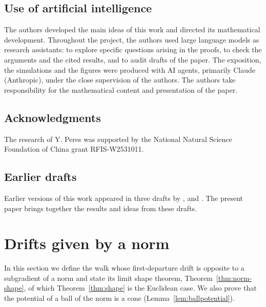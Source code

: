 \documentclass[11pt]{amsart}
\theoremstyle{plain}
\theoremstyle{definition}
\numberwithin{equation}{section}
\begin{document}
\subsection*{Use of artificial intelligence}
The authors developed the main ideas of this work and directed its mathematical development. Throughout the project, the authors used large language models as research assistants: to explore specific questions arising in the proofs, to check the arguments and the cited results, and to audit drafts of the paper. The exposition, the simulations and the figures were produced with AI agents, primarily Claude (Anthropic), under the close supervision of the authors. The authors take responsibility for the mathematical content and presentation of the paper.

\subsection*{Acknowledgments}
The research of Y. Peres was supported by the National Natural Science Foundation of China grant RFIS-W2531011.

\subsection*{Earlier drafts}
Earlier versions of this work appeared in three drafts by \citet{Nguyen2026},
\citet{BouRabeePeres2026CERW} and \citet{Singh2026}. The present paper brings together the results and ideas from these drafts.

\section{Drifts given by a norm}\label{sec:norm-setup}

In this section we define the walk whose first-departure drift is opposite to a subgradient of a norm and state its limit shape theorem, Theorem~\ref{thm:norm-shape}, of which Theorem~\ref{thm:shape} is the Euclidean case. We also prove that the potential of a ball of the norm is a cone (Lemma~\ref{lem:ballpotential}).
\end{document}
